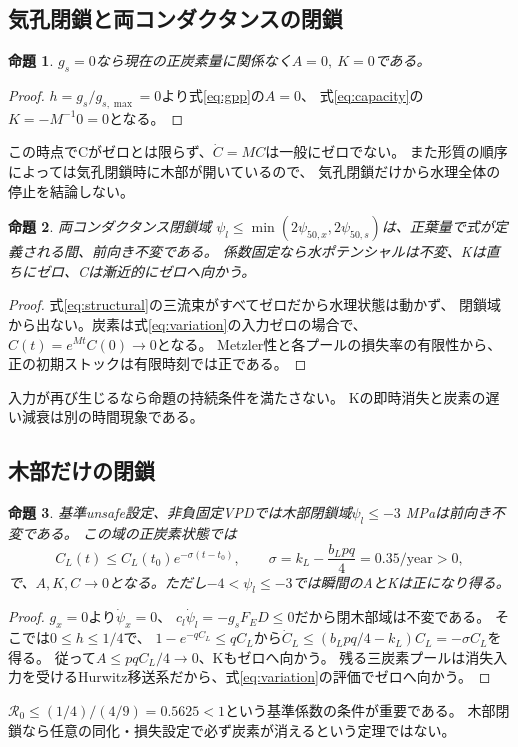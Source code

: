 \documentclass[a4paper,11pt]{ltjsarticle}
\newtheorem{proposition}{命題}[section]
\begin{document}
\subsection{気孔閉鎖と両コンダクタンスの閉鎖}
\begin{proposition}\label{prop:gs}
$g_s=0$なら現在の正炭素量に関係なく$A=0,\ K=0$である。
\end{proposition}
\begin{proof}
$h=g_s/g_{s,\max}=0$より式\eqref{eq:gpp}の$A=0$、
式\eqref{eq:capacity}の$K=-M^{-1}0=0$となる。
\end{proof}
この時点でCがゼロとは限らず、$\dot C=MC$は一般にゼロでない。
また形質の順序によっては気孔閉鎖時に木部が開いているので、
気孔閉鎖だけから水理全体の停止を結論しない。

\begin{proposition}\label{prop:closed}
両コンダクタンス閉鎖域
$\psi_l\le\min(2\psi_{50,x},2\psi_{50,s})$は、正葉量で式が定義される間、前向き不変である。
係数固定なら水ポテンシャルは不変、Kは直ちにゼロ、Cは漸近的にゼロへ向かう。
\end{proposition}
\begin{proof}
式\eqref{eq:structural}の三流束がすべてゼロだから水理状態は動かず、
閉鎖域から出ない。炭素は式\eqref{eq:variation}の入力ゼロの場合で、
$C(t)=e^{Mt}C(0)\to0$となる。
Metzler性と各プールの損失率の有限性から、正の初期ストックは有限時刻では正である。
\end{proof}
入力が再び生じるなら命題の持続条件を満たさない。
Kの即時消失と炭素の遅い減衰は別の時間現象である。

\subsection{木部だけの閉鎖}
\begin{proposition}\label{prop:gx}
基準unsafe設定、非負固定VPDでは木部閉鎖域$\psi_l\le-3$ MPaは前向き不変である。
この域の正炭素状態では
\begin{equation}\label{eq:sigma}
 C_L(t)\le C_L(t_0)e^{-\sigma(t-t_0)},\qquad
 \sigma=k_L-\frac{b_Lpq}{4}=0.35/\mathrm{year}>0,
\end{equation}
で、$A,K,C\to0$となる。ただし$-4<\psi_l\le-3$では瞬間のAとKは正になり得る。
\end{proposition}
\begin{proof}
$g_x=0$より$\dot\psi_x=0$、
$c_l\dot\psi_l=-g_sF_ED\le0$だから閉木部域は不変である。
そこでは$0\le h\le1/4$で、
$1-e^{-qC_L}\le qC_L$から$\dot C_L\le(b_Lpq/4-k_L)C_L=-\sigma C_L$を得る。
従って$A\le pqC_L/4\to0$、Kもゼロへ向かう。
残る三炭素プールは消失入力を受けるHurwitz移送系だから、式\eqref{eq:variation}の評価でゼロへ向かう。
\end{proof}
$\mathcal R_0\le(1/4)/(4/9)=0.5625<1$という基準係数の条件が重要である。
木部閉鎖なら任意の同化・損失設定で必ず炭素が消えるという定理ではない。
\end{document}
